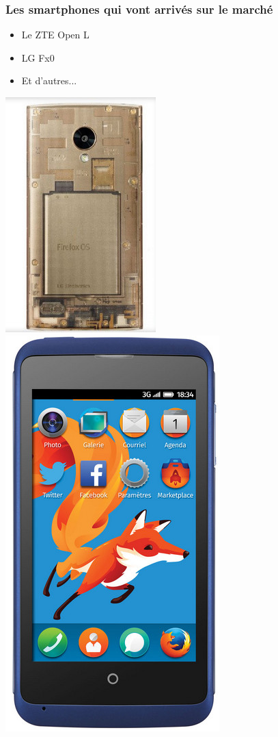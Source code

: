 \documentclass{beamer}
\begin{document}
\begin{frame}
\frametitle{Les smartphones qui vont arrivés sur le marché}
\begin{itemize}
\item Le ZTE Open L
\item LG Fx0
\item Et d'autres...
\end{itemize}
\begin{center}
\includegraphics[scale=0.5]{./images/ffos_lg.jpg}
~~~
\includegraphics[scale=0.3]{./images/ZE_Open_C.jpg}
\end{center}
\end{frame}
\end{document}
